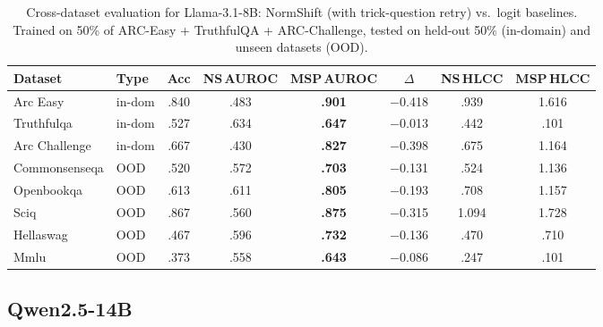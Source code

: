 \documentclass[11pt,a4paper]{article}
\begin{document}
\begin{table}[H]
\centering
\caption{Cross-dataset evaluation for Llama-3.1-8B: NormShift (with trick-question retry) vs.\ logit baselines.
         Trained on 50\% of ARC-Easy + TruthfulQA + ARC-Challenge,
         tested on held-out 50\% (in-domain) and unseen datasets (OOD).}
\label{tab:cross-dataset-llama31-8b}
\small
\begin{tabular}{@{}llcccccc@{}}
\toprule
Dataset & Type & Acc & NS\,AUROC & MSP\,AUROC & $\Delta$ & NS\,HLCC & MSP\,HLCC \\
\midrule
Arc Easy             & in-dom & .840 & .483 & \textbf{.901} & $-$0.418 & .939 & 1.616 \\
Truthfulqa           & in-dom & .527 & .634 & \textbf{.647} & $-$0.013 & .442 & .101 \\
Arc Challenge        & in-dom & .667 & .430 & \textbf{.827} & $-$0.398 & .675 & 1.164 \\
Commonsenseqa        & OOD & .520 & .572 & \textbf{.703} & $-$0.131 & .524 & 1.136 \\
Openbookqa           & OOD & .613 & .611 & \textbf{.805} & $-$0.193 & .708 & 1.157 \\
Sciq                 & OOD & .867 & .560 & \textbf{.875} & $-$0.315 & 1.094 & 1.728 \\
Hellaswag            & OOD & .467 & .596 & \textbf{.732} & $-$0.136 & .470 & .710 \\
Mmlu                 & OOD & .373 & .558 & \textbf{.643} & $-$0.086 & .247 & .101 \\
\bottomrule
\end{tabular}
\end{table}

\subsection{Qwen2.5-14B}
\end{document}
